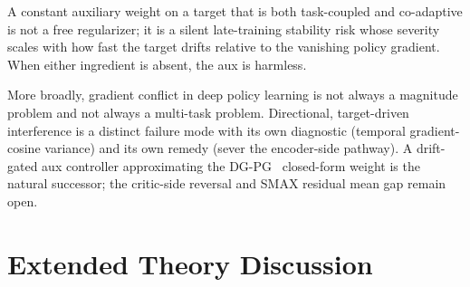 \documentclass{article}
\theoremstyle{plain}
\theoremstyle{definition}
\theoremstyle{remark}
\begin{document}
A constant auxiliary weight on a target that is both task-coupled
and co-adaptive is not a free regularizer; it is a silent
late-training stability risk whose severity scales with how fast
the target drifts relative to the vanishing policy gradient. When
either ingredient is absent, the aux is harmless.

More broadly, gradient conflict in deep policy learning is not
always a magnitude problem and not always a multi-task problem.
Directional, target-driven interference is a distinct failure mode
with its own diagnostic (temporal gradient-cosine variance) and
its own remedy (sever the encoder-side pathway). A drift-gated
aux controller approximating the DG-PG~\cite{yang2026dgpg}
closed-form weight is the natural successor; the critic-side
reversal and SMAX residual mean gap remain open.






\newpage
\appendix

\section{Extended Theory Discussion}
\label{app:theory_extended}
\end{document}

